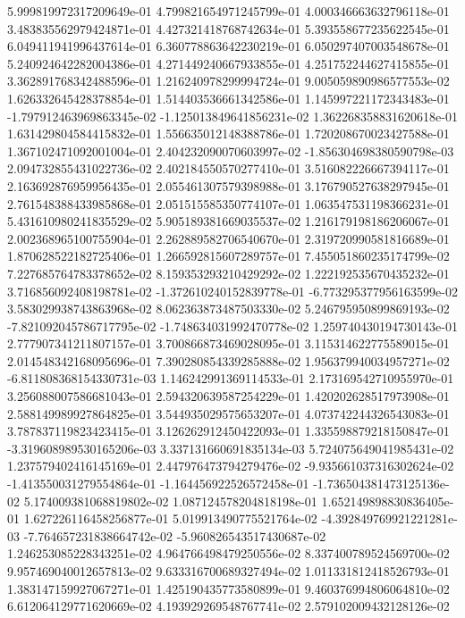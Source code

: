 5.999819972317209649e-01
4.799821654971245799e-01
4.000346663632796118e-01
3.483835562979424871e-01
4.427321418768742634e-01
5.393558677235622545e-01
6.049411941996437614e-01
6.360778863642230219e-01
6.050297407003548678e-01
5.240924642282004386e-01
4.271449240667933855e-01
4.251752244627415855e-01
3.362891768342488596e-01
1.216240978299994724e-01
9.005059890986577553e-02
1.626332645428378854e-01
1.514403536661342586e-01
1.145997221172343483e-01
-1.797912463969863345e-02
-1.125013849641856231e-02
1.362268358831620618e-01
1.631429804584415832e-01
1.556635012148388786e-01
1.720208670023427588e-01
1.367102471092001004e-01
2.404232090070603997e-02
-1.856304698380590798e-03
2.094732855431022736e-02
2.402184550570277410e-01
3.516082226667394117e-01
2.163692876959956435e-01
2.055461307579398988e-01
3.176790527638297945e-01
2.761548388433985868e-01
2.051515585350774107e-01
1.063547531198366231e-01
5.431610980241835529e-02
5.905189381669035537e-02
1.216179198186206067e-01
2.002368965100755904e-01
2.262889582706540670e-01
2.319720990581816689e-01
1.870628522182725406e-01
1.266592815607289757e-01
7.455051860235174799e-02
7.227685764783378652e-02
8.159353293210429292e-02
1.222192535670435232e-01
3.716856092408198781e-02
-1.372610240152839778e-01
-6.773295377956163599e-02
3.583029938743863968e-02
8.062363873487503330e-02
5.246795950899869193e-02
-7.821092045786717795e-02
-1.748634031992470778e-02
1.259740430194730143e-01
2.777907341211807157e-01
3.700866873469028095e-01
3.115314622775589015e-01
2.014548342168095696e-01
7.390280854339285888e-02
1.956379940034957271e-02
-6.811808368154330731e-03
1.146242991369114533e-01
2.173169542710955970e-01
3.256088007586681043e-01
2.594320639587254229e-01
1.420202628517973908e-01
2.588149989927864825e-01
3.544935029575653207e-01
4.073742244326543083e-01
3.787837119823423415e-01
3.126262912450422093e-01
1.335598879218150847e-01
-3.319608989530165206e-03
3.337131660691835134e-03
5.724075649041985431e-02
1.237579402416145169e-01
2.447976473794279476e-02
-9.935661037316302624e-02
-1.413550031279554864e-01
-1.164456922526572458e-01
-1.736504381473125136e-02
5.174009381068819802e-02
1.087124578204818198e-01
1.652149898830836405e-01
1.627226116458256877e-01
5.019913490775521764e-02
-4.392849769921221281e-03
-7.764657231838664742e-02
-5.960826543517430687e-02
1.246253085228343251e-02
4.964766498479250556e-02
8.337400789524569700e-02
9.957469040012657813e-02
9.633316700689327494e-02
1.011331812418526793e-01
1.383147159927067271e-01
1.425190435773580899e-01
9.460376994806064810e-02
6.612064129771620669e-02
4.193929269548767741e-02
2.579102009432128126e-02
